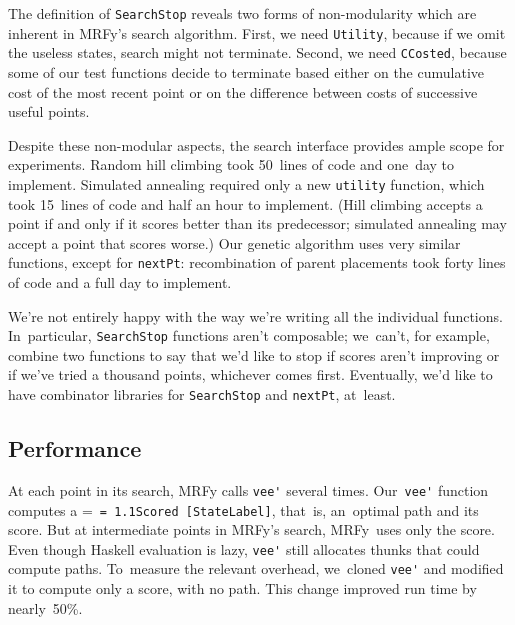 \documentclass[]{jfp1}
\makeatletter
\newcommand\mrfy{MRFy} %
\newcommand\seclabel[1]{\label{sec:#1}}
\newcommand{\mono}[1]{%
  {\@tempdima = \fontdimen2\font
   \texttt{\spaceskip = 1.1\@tempdima #1}}}
\makeatother
\begin{document}
The definition of \texttt{SearchStop} reveals two forms of
non-modularity which are inherent in \mrfy's search algorithm.
First, we need \texttt{Utility}, because if we omit the useless states,
search might not terminate.
Second, we need \texttt{CCosted}, because some of our test functions
decide to terminate based either on the cumulative cost of the most
recent point or on the difference between costs of successive useful points.

Despite these non-modular aspects, the search
interface provides ample scope for
experiments.
Random hill climbing took 50~lines of code and one~day to
implement.  
Simulated annealing required only a new
\texttt{utility} function, which took 15~lines of code and half an hour to implement.
(Hill climbing accepts a point if and only if it scores better than its
predecessor;
simulated annealing may accept a point that scores worse.)
Our genetic algorithm uses very similar
functions, except for \texttt{nextPt}:
recombination of parent
placements took forty lines of code
and a full day to implement.
{\ifpagetuning{} \par\fi}

We're not entirely happy with the way we're writing all the individual
functions.
In~particular, \texttt{SearchStop} functions aren't composable;
we~can't, for example, combine two functions to say that we'd like to
stop if scores aren't improving or if we've tried a thousand points,
whichever comes first.
Eventually, we'd like to have
combinator libraries for \texttt{SearchStop} and \texttt{nextPt}, at~least.



\subsection{Performance}

\seclabel{perf}
\seclabel{performance}

At each point in its search,
MRFy calls \verb+vee'+ several
 times.
Our~\verb+vee'+
function computes a \mbox{\mono{Scored [StateLabel]}}, that~is, 
an~optimal path and its score.
But at intermediate points in \mrfy's search,
\mrfy\ uses only the
score.
Even though Haskell evaluation is lazy, \verb+vee'+ 
still allocates thunks that could compute paths.
To~measure the relevant overhead,
we~cloned \verb+vee'+ and modified it to compute
only a score, with no path.
This change improved 
run time by nearly~50\%.
\end{document}
